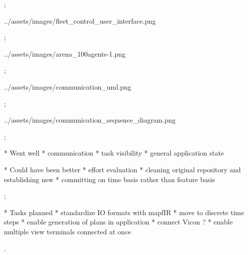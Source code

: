 \pg;


\centerline{\picw=16cm \inspic ../assets/images/fleet_control_user_interface.png }

\pg;



\centerline{\picw=14cm \inspic ../assets/images/arena_100agents-1.png }

\pg;



\centerline{\picw=16cm \inspic ../assets/images/communication_uml.png }

\pg;


\centerline{\picw=16cm \inspic ../assets/images/communication_sequence_diagram.png }

\pg;



* Went well
\typosize[14/14]
\begitems
* communication
* task visibility
* general application state
\enditems

* Could have been better
\typosize[14/14]
\begitems
* effort evaluation
* cleaning original repository and establishing new
* committing on time basis rather than feature basis
\enditems

\pg;



* Tasks planned
\typosize[14/14]
\begitems
* standardize IO formats with mapfIR
* move to discrete time steps
* enable generation of plans in application
* connect Vicon ?
* enable multiple view terminals connected at once
\enditems

\pg.
